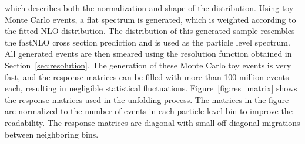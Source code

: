 which describes both the normalization and shape of the distribution. Using toy
Monte Carlo events, a flat \ptavg spectrum is generated, which is weighted
according to the fitted NLO distribution. The distribution of this generated
sample resembles the fastNLO cross section prediction and is used as the
particle level \ptavg spectrum. All generated events are then smeared using the
resolution function obtained in Section~\ref{sec:resolution}. The generation of
these Monte Carlo toy events is very fast, and the response matrices can be
filled with more than 100 million events each, resulting in negligible statistical
fluctuations. Figure~\ref{fig:res_matrix} shows the response matrices used in
the unfolding process. The matrices in the figure are normalized to the number
of events in each particle level bin to improve the readability. The response
matrices are diagonal with small off-diagonal migrations between neighboring
\ptavg bins.

